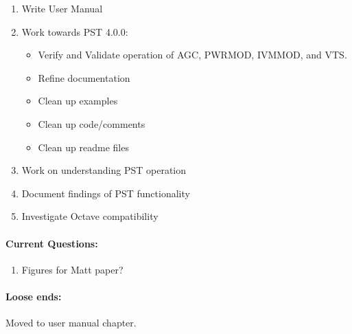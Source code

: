 \documentclass[12pt]{article}
\begin{document}
\begin{multicols}{2}
\begin{enumerate}
	\item Write User Manual

	\item Work towards PST 4.0.0:
		\begin{itemize}
			\footnotesize
			\itemsep0em
			\item Verify and Validate operation of AGC, PWRMOD, IVMMOD, and VTS.
			\item Refine documentation	
			\item Clean up examples
			\item Clean up code/comments
			\item Clean up readme files
		\end{itemize}

	\item Work on understanding PST operation
	\item Document findings of PST functionality
	\item Investigate Octave compatibility
\end{enumerate}

\vfill\null
\columnbreak

\paragraph{Current Questions:}
	\begin{enumerate}
	\itemsep0em 
	\item Figures for Matt paper?
	
	\end{enumerate}	

\paragraph{Loose ends:} %
Moved to user manual chapter.
	

\end{multicols}
\end{document}
